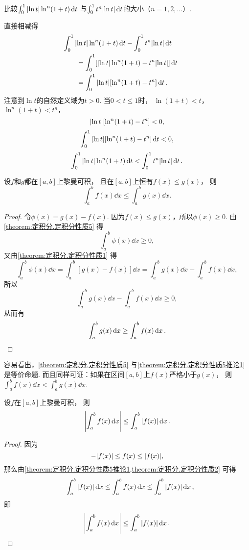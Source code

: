 \begin{example}
比较\(\int_0^1 \abs{\ln t} \ln^n(1+t) \dd{t}\)
与\(\int_0^1 t^n \abs{\ln t} \dd{t}\)的大小（\(n=1,2,\dotsc\)）.
\begin{solution}
直接相减得
\begin{align*}
	&\hspace{-20pt}
	\int_0^1 \abs{\ln t} \ln^n(1+t) \dd{t} - \int_0^1 t^n \abs{\ln t} \dd{t} \\
	&= \int_0^1 [\abs{\ln t} \ln^n(1+t) - t^n \abs{\ln t}] \dd{t} \\
	&= \int_0^1 \abs{\ln t} [\ln^n(1+t) - t^n] \dd{t}.
\end{align*}
注意到\(\ln t\)的自然定义域为\(t > 0\).
当\(0 < t \leq 1\)时，
\(\ln(1+t) < t\)，
\(\ln^n(1+t) < t^n\)，
\[
	\abs{\ln t} [\ln^n(1+t) - t^n] < 0,
\]\[
	\int_0^1 \abs{\ln t} [\ln^n(1+t) - t^n] \dd{t} < 0,
\]\[
	\int_0^1 \abs{\ln t} \ln^n(1+t) \dd{t} < \int_0^1 t^n \abs{\ln t} \dd{t}.
\]
\end{solution}
\end{example}

\begin{corollary}\label{theorem:定积分.定积分性质5推论1}
设\(f\)和\(g\)都在\([a,b]\)上黎曼可积，
且在\([a,b]\)上恒有\(f(x) \leq g(x)\)，
则\[
	\int_a^b f(x) \dd{x} \leq \int_a^b g(x) \dd{x}.
\]
\begin{proof}
令\(\phi(x) = g(x) - f(x)\).
因为\(f(x) \leq g(x)\)，所以\(\phi(x) \geq 0\).
由\cref{theorem:定积分.定积分性质5} 得\[
	\int_a^b \phi(x) \dd{x} \geq 0,
\]
又由\cref{theorem:定积分.定积分性质1} 得\[
	\int_a^b \phi(x) \dd{x}
	= \int_a^b [g(x) - f(x)] \dd{x}
	= \int_a^b g(x) \dd{x} - \int_a^b f(x) \dd{x},
\]
所以\[
	\int_a^b g(x) \dd{x} - \int_a^b f(x) \dd{x} \geq 0,
\]
从而有\[
	\int_a^b g(x) \dd{x} \geq \int_a^b f(x) \dd{x}.
	\qedhere
\]
\end{proof}
\end{corollary}
\begin{remark}
容易看出，\cref{theorem:定积分.定积分性质5} 与\cref{theorem:定积分.定积分性质5推论1} 是等价命题.
而且同样可证：如果在区间\([a,b]\)上\(f(x)\)严格小于\(g(x)\)，
则\(\int_a^b f(x) \dd{x} < \int_a^b g(x) \dd{x}\).
\end{remark}

\begin{corollary}\label{theorem:定积分.定积分性质5推论2}
设\(f\)在\([a,b]\)上黎曼可积，
则\begin{equation}
	\abs{\int_a^b f(x) \dd{x}} \leq \int_a^b \abs{f(x)} \dd{x}.
\end{equation}
\begin{proof}
因为\[
	-\abs{f(x)} \leq f(x) \leq \abs{f(x)},
\]
那么由\cref{theorem:定积分.定积分性质5推论1,theorem:定积分.定积分性质2} 可得\[
	-\int_a^b \abs{f(x)} \dd{x}
	\leq
	\int_a^b f(x) \dd{x}
	\leq
	\int_a^b \abs{f(x)} \dd{x},
\]
即\[
	\abs{\int_a^b f(x) \dd{x}} \leq \int_a^b \abs{f(x)} \dd{x}.
	\qedhere
\]
\end{proof}
\end{corollary}

